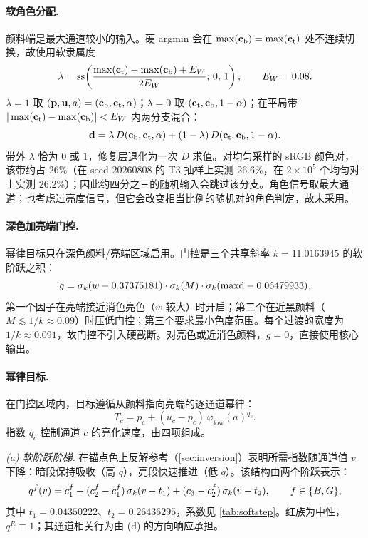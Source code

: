 \paragraph{软角色分配.}
\label{sec:role}
颜料端是最大通道较小的输入。硬 argmin 会在 $\max(\mathbf{c}_{\mathrm{b}})=\max(\mathbf{c}_{\mathrm{t}})$ 处不连续切换，故使用软隶属度
\begin{equation}
\lambda=\operatorname{ss}\!\left(\frac{\max(\mathbf{c}_{\mathrm{t}})-\max(\mathbf{c}_{\mathrm{b}})+E_{W}}{2E_{W}};\,0,\,1\right),
\qquad E_{W}=0.08.
\label{eq:lambda}
\end{equation}
$\lambda=1$ 取 $(\mathbf{p},\mathbf{u},a)=(\mathbf{c}_{\mathrm{b}},\mathbf{c}_{\mathrm{t}},\alpha)$；$\lambda=0$ 取 $(\mathbf{c}_{\mathrm{t}},\mathbf{c}_{\mathrm{b}},1-\alpha)$；在平局带 $|\max(\mathbf{c}_{\mathrm{t}})-\max(\mathbf{c}_{\mathrm{b}})|<E_{W}$ 内两分支混合：
\begin{equation}
\mathbf{d}=\lambda\,D(\mathbf{c}_{\mathrm{b}},\mathbf{c}_{\mathrm{t}},\alpha)+(1-\lambda)\,D(\mathbf{c}_{\mathrm{t}},\mathbf{c}_{\mathrm{b}},1-\alpha).
\label{eq:dblend}
\end{equation}
带外 $\lambda$ 恰为 $0$ 或 $1$，修复层退化为一次 $D$ 求值。对均匀采样的 sRGB 颜色对，该带约占 $26\%$（在 seed 20260808 的 T3 抽样上实测 26.6\%，在 $2\times10^{5}$ 个均匀对上实测 26.2\%）；因此约四分之三的随机输入会跳过该分支。角色信号取最大通道；也考虑过亮度信号，但它会改变相当比例的随机对的角色判定，故未采用。

\paragraph{深色加亮端门控.}
幂律目标只在深色颜料/亮端区域启用。门控是三个共享斜率 $k=11.0163945$ 的软阶跃之积：
\begin{equation}
g=\sigma_{k}(w-0.37375181)\cdot\sigma_{k}(M)\cdot\sigma_{k}(\mathrm{maxd}-0.06479933).
\label{eq:gate}
\end{equation}
第一个因子在亮端接近消色亮色（$w$ 较大）时开启；第二个在近黑颜料（$M\lesssim1/k\approx0.09$）时压低门控；第三个要求最小色度范围。每个过渡的宽度为 $1/k\approx0.091$，故门控不引入硬截断。对亮色或近消色颜料，$g=0$，直接使用核心输出。

\paragraph{幂律目标.}
在门控区域内，目标遵循从颜料指向亮端的逐通道幂律：
\begin{equation}
T_{c}=p_{c}+(u_{c}-p_{c})\,\varphi_{\mathrm{low}}(a)^{q_{c}}.
\label{eq:target}
\end{equation}
指数 $q_{c}$ 控制通道 $c$ 的亮化速度，由四项组成。

\emph{(a) 软阶跃阶梯.} 在锚点色上反解参考（\cref{sec:inversion}）表明所需指数随通道值 $v$ 下降：暗段保持吸收（高 $q$），亮段快速推进（低 $q$）。该结构由两个阶跃表示：
\begin{equation}
q^{f}(v)=c_{1}^{f}+(c_{2}^{f}-c_{1}^{f})\,\sigma_{k}(v-t_{1})+(c_{3}-c_{2}^{f})\,\sigma_{k}(v-t_{2}),
\qquad f\in\{B,G\},
\label{eq:staircase}
\end{equation}
其中 $t_{1}=0.04350222$、$t_{2}=0.26436295$，系数见 \cref{tab:softstep}。红族为中性，$q^{R}\equiv1$；其通道相关行为由 (d) 的方向响应承担。

